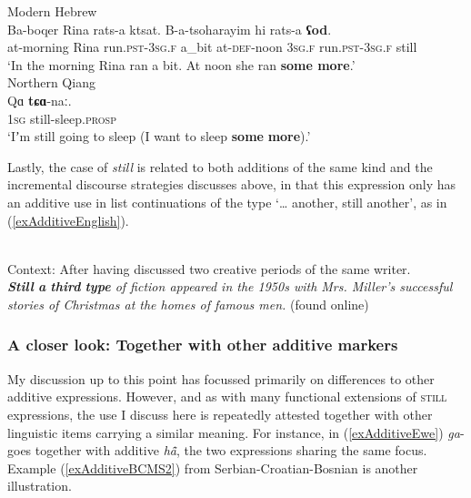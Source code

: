 \begin{exe}
	\ex Modern Hebrew\label{exAdditiveTypesHebrewMore2}\\
	\gll Ba-boqer Rina rats-a ktsat. B-a-tsoharayim hi rats-a \textbf{ʕod}.\\
	at-morning Rina run.\textsc{pst}-3\textsc{sg}.\textsc{f} a\_bit at-\textsc{def}-noon 3\textsc{sg}.\textsc{f} run.\textsc{pst}-3\textsc{sg}.\textsc{f} still\\
	\glt \lq In the morning Rina ran a bit. At noon she ran \textbf{some more}.'
	\\\parencite[127]{Greenberg2012}
	\pagebreak	
    \ex Northern Qiang\label{exAdditiveyTypesQiangMore}\\
	\gll Qɑ \textbf{tɕɑ}-naː.\\
	1\textsc{sg} still-sleep.\textsc{prosp}\\
	\glt \lq Iʼm still going to sleep (I want to sleep \textbf{some} \textbf{more}).'
	\\\parencite[169]{LaPollaHuang2003}
\end{exe}

Lastly,  the case of  \textit{still} is related to both additions of the same kind and the incremental discourse strategies discusses above, in that this expression only has an additive use in list continuations of the type \lq … another, still another\rq{}, as in (\ref{exAdditiveEnglish}).

\begin{exe}
	\ex {}\label{exAdditiveEnglish}\\
Context: After having discussed two creative periods of the same writer.\\
	\textit{\textbf{Still} \textbf{a} \textbf{third} \textbf{type} of fiction appeared in the 1950s with Mrs. Miller's successful stories of Christmas at the homes of famous men.} (found online)%
\end{exe}

\subsubsection{A closer look: Together with other additive markers} My discussion up to this point has focussed primarily on differences to other additive expressions. However, and as with many functional extensions of \textsc{still} expressions, the use I discuss here is repeatedly attested together with other linguistic items carrying a similar meaning. For instance, in (\ref{exAdditiveEwe})  \mbox{\textit{ga}-} goes together with additive \textit{hã̂}, the two expressions sharing the same focus. Example (\ref{exAdditiveBCMS2}) from Serbian-Croatian-Bosnian is another illustration.

